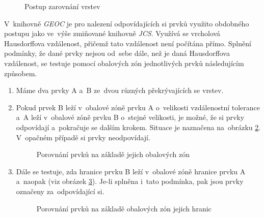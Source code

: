 \label{capic}
  \begin{figure}[hbt]
    \centering
      
      \caption{Postup zarovnání vrstev}
      \label{fig:ca-princip}
  \end{figure}

V~knihovně \textit{GEOC} je pro nalezení odpovídajících si prvků využito 
obdobného postupu jako ve~výše zmiňované knihovně \textit{JCS}. Využívá 
se vrcholová Hausdorffova vzdálenost, přičemž tato vzdálenost není počítána 
přímo. Splnění podmínky, že dané prvky nejsou od~sebe dále, než je daná 
Hausdorffova vzdálenost, se testuje pomocí obalových zón jednotlivých prvků 
následujícím způsobem.

\begin{enumerate}
 \item Máme dva prvky A a~B ze~dvou různých překrývajících se vrstev.
 \item Pokud prvek B leží v~obalové zóně prvku A o~velikosti vzdálenostní 
    tolerance a~A leží v~obalové zóně prvku B o~stejné velikosti, je možné, 
    že si prvky odpovídají a~pokračuje se dalším krokem. Situace je naznačena
    na~obrázku \ref{fig:buffer}. V~opačném případě si prvky neodpovídají.

\label{bfpic}
  \begin{figure}[hbt]
    \centering
      \scriptsize
      
      \caption{Porovnání prvků na základě jejich obalových zón}
      \label{fig:buffer}

  \end{figure}
 \item Dále se testuje, zda hranice prvku B leží v~obalové zóně hranice prvku
    A a~naopak (viz obrázek \ref{fig:buffer-boundary}). Je-li splněna i~tato 
    podmínka, pak jsou prvky označeny za~odpovídající si.

\label{bf2pic}
  \begin{figure}[hbt]
    \centering
      \scriptsize
      
      \caption{Porovnání prvků na základě obalových zón jejich hranic}
      \label{fig:buffer-boundary}
  \end{figure}

\end{enumerate}

